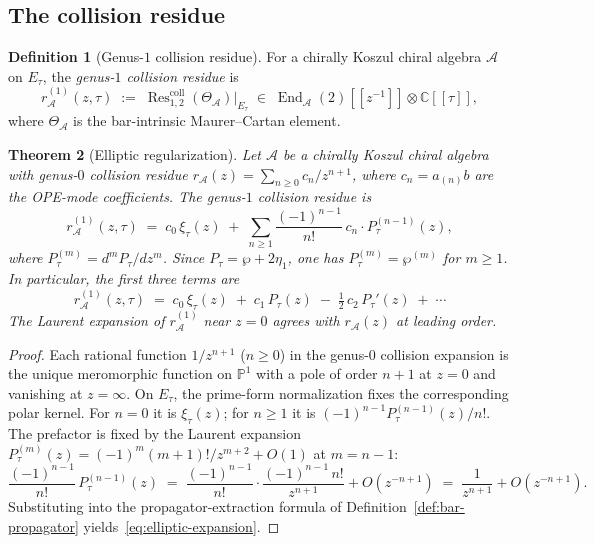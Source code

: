 \documentclass[11pt]{article}
\theoremstyle{plain}
\newtheorem{theorem}{Theorem}[section]
\theoremstyle{definition}
\newtheorem{definition}[theorem]{Definition}
\theoremstyle{remark}
\newcommand{\cA}{\mathcal{A}}
\newcommand{\Res}{\operatorname{Res}}
\DeclareMathOperator{\End}{End}
\numberwithin{equation}{section}
\begin{document}
\subsection{The collision residue}

\begin{definition}[Genus-$1$ collision residue]\label{def:collision-residue}
For a chirally Koszul chiral algebra $\cA$ on $E_\tau$, the
\emph{genus-$1$ collision residue} is
\begin{equation}\label{eq:collision-residue}
r_\cA^{(1)}(z,\tau)
\;:=\;
\Res^{\mathrm{coll}}_{1,2}(\Theta_\cA)\big|_{E_\tau}
\;\in\;
\End_\cA(2)[\![z^{-1}]\!] \otimes \mathbb{C}[\![\tau]\!],
\end{equation}
where $\Theta_\cA$ is the bar-intrinsic Maurer--Cartan element.
\end{definition}

\begin{theorem}[Elliptic regularization]\label{thm:elliptic-reg}
Let $\cA$ be a chirally Koszul chiral algebra with genus-$0$ collision
residue $r_\cA(z) = \sum_{n \geq 0} c_n/z^{n+1}$, where
$c_n = a_{(n)}b$ are the OPE-mode coefficients. The genus-$1$
collision residue is
\begin{equation}\label{eq:elliptic-expansion}
r_\cA^{(1)}(z,\tau)
\;=\;
c_0\,\xi_\tau(z)
\;+\;
\sum_{n \geq 1}
\frac{(-1)^{n-1}}{n!}\,c_n \cdot P_\tau^{(n-1)}(z),
\end{equation}
where \(P_\tau^{(m)}=d^mP_\tau/dz^m\). Since
\(P_\tau=\wp+2\eta_1\), one has \(P_\tau^{(m)}=\wp^{(m)}\) for
\(m\geq1\). In particular, the first three
terms are
\begin{equation}\label{eq:first-three}
r_\cA^{(1)}(z,\tau)
\;=\;
c_0\,\xi_\tau(z)
\;+\;
c_1\,P_\tau(z)
\;-\;
\tfrac{1}{2}\,c_2\,P_\tau'(z)
\;+\;\cdots
\end{equation}
The Laurent expansion of $r_\cA^{(1)}$ near $z = 0$ agrees with
$r_\cA(z)$ at leading order.
\end{theorem}

\begin{proof}
Each rational function $1/z^{n+1}$ ($n \geq 0$) in the genus-$0$
collision expansion is the unique meromorphic function on
$\mathbb{P}^1$ with a pole of order $n+1$ at $z = 0$ and vanishing
at $z = \infty$. On $E_\tau$, the prime-form normalization fixes the
corresponding polar kernel. For \(n=0\) it is \(\xi_\tau(z)\); for
\(n\geq1\) it is \((-1)^{n-1}P_\tau^{(n-1)}(z)/n!\). The prefactor is
fixed by the Laurent expansion
$P_\tau^{(m)}(z) = (-1)^m(m+1)!/z^{m+2} + O(1)$ at $m = n-1$:
\[
\frac{(-1)^{n-1}}{n!}\,P_\tau^{(n-1)}(z)
\;=\;
\frac{(-1)^{n-1}}{n!}\cdot\frac{(-1)^{n-1}\,n!}{z^{n+1}} + O(z^{-n+1})
\;=\;
\frac{1}{z^{n+1}} + O(z^{-n+1}).
\]
Substituting into the propagator-extraction formula of
Definition~\ref{def:bar-propagator}
yields~\eqref{eq:elliptic-expansion}.
\end{proof}
\end{document}
